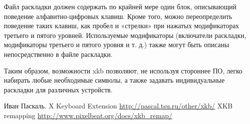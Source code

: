\documentclass[10pt, a5paper]{article}
\begin{document}
Файл раскладки должен содержать по крайней мере один блок, описывающий поведение алфавитно-цифровых клавиш. Кроме того, можно переопределить поведение таких клавиш, как пробел и «стрелки» при нажатых модификаторах третьего и пятого уровней.
Используемые модификаторы (включатели раскладки, модификаторы третьего и пятого уровня и т. д.) также могут быть описаны непосредственно в файле раскладки.

Таким образом, возможности xkb позволяют, не используя стороннее ПО, легко набирать любые необходимые символы, а также задавать индивидуальные раскладки для различных устройств.

\begin{thebibliography}{99}
 Иван Паскаль. X Keyboard Extension \url{http://pascal.tsu.ru/other/xkb/}
 XKB remapping \url{http://www.pixelbeat.org/docs/xkb\_remap/}
\end{thebibliography}
\end{document}
